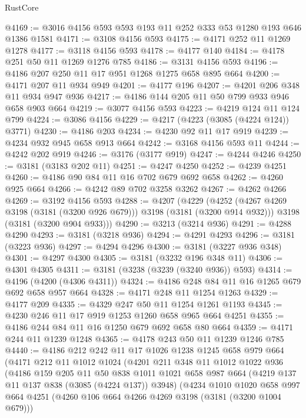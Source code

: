 \begin{lexlean}{RustCore}
\begin{coremodule}
@4169 := @3016 @4156 @593 @593 @193 @11 @252 @333 @53 @1280 @193 @646 @1386 @1581
@4171 := @3108 @4156 @593
@4175 := @4171 @252 @11 @1269 @1278
@4177 := @3118 @4156 @593
@4178 := @4177 @140
@4184 := @4178 @251 @50 @11 @1269 @1276 @785
@4186 := @3131 @4156 @593
@4196 := @4186 @207 @250 @11 @17 @951 @1268 @1275 @658 @895 @664
@4200 := @4171 @207 @11 @934 @949
@4201 := @4177 @196
@4207 := @4201 @206 @348 @11 @934 @947 @936
@4217 := @4186 @144 @205 @11 @50 @799 @933 @946 @658 @903 @664
@4219 := @3077 @4156 @593
@4223 := @4219 @124 @11 @124 @799
@4224 := @3086 @4156
@4229 := @4217 (@4223 (@3085 (@4224 @124)) @3771)
@4230 := @4186 @203
@4234 := @4230 @92 @11 @17 @919
@4239 := @4234 @932 @945 @658 @913 @664
@4242 := @3168 @4156 @593 @11
@4244 := @4242 @202 @919
@4246 := @3176 (@3177 @919)
@4247 := @4244 @4246
@4250 := @3181 (@3183 @202 @11)
@4251 := @4247 @4250
@4252 := @4239 @4251
@4260 := @4186 @90 @84 @11 @16 @702 @679 @692 @658
@4262 := @4260 @925 @664
@4266 := @4242 @89 @702 @3258 @3262
@4267 := @4262 @4266
@4269 := @3192 @4156 @593
@4288 := @4207
    (@4229
      (@4252 (@4267 @4269 @3198 (@3181 (@3200 @926 @679))) @3198 (@3181 (@3200 @914 @932)))
      @3198
      (@3181 (@3200 @904 @933)))
@4290 := @3213 (@3214 @936)
@4291 := @4288 @4290
@4293 := @3181 (@3218 @936)
@4294 := @4291 @4293
@4296 := @3181 (@3223 @936)
@4297 := @4294 @4296
@4300 := @3181 (@3227 @936 @348)
@4301 := @4297 @4300
@4305 := @3181 (@3232 @196 @348 @11)
@4306 := @4301 @4305
@4311 := @3181 (@3238 (@3239 (@3240 @936)) @593)
@4314 := @4196 (@4200 (@4306 @4311))
@4324 := @4186 @248 @84 @11 @16 @1265 @679 @692 @658 @957 @664
@4328 := @4171 @248 @11 @1254 @1263
@4329 := @4177 @209
@4335 := @4329 @247 @50 @11 @1254 @1261 @1193
@4345 := @4230 @246 @11 @17 @919 @1253 @1260 @658 @965 @664 @4251
@4355 := @4186 @244 @84 @11 @16 @1250 @679 @692 @658 @80 @664
@4359 := @4171 @244 @11 @1239 @1248
@4365 := @4178 @243 @50 @11 @1239 @1246 @785
@4440 := @4186
    @212
    @242
    @11
    @17
    @1026
    @1238
    @1245
    @658
    @979
    @664
    (@4171
      @212
      @11
      @1012
      @1024
      (@4201
        @211
        @348
        @11
        @1012
        @1022
        @936
        (@4186
          @159
          @205
          @11
          @50
          @838
          @1011
          @1021
          @658
          @987
          @664
          (@4219 @137 @11 @137 @838 (@3085 (@4224 @137)) @3948)
          (@4234
            @1010
            @1020
            @658
            @997
            @664
            @4251
            (@4260 @106 @664 @4266 @4269 @3198 (@3181 (@3200 @1004 @679)))

\end{coremodule}
\end{lexlean}
